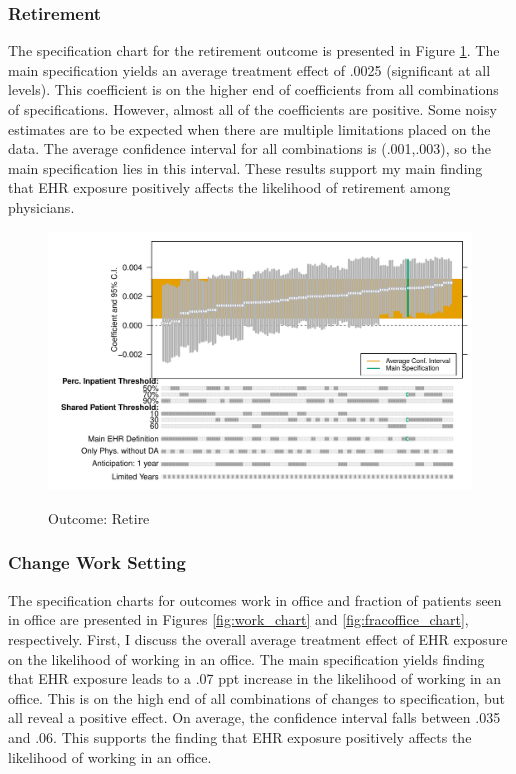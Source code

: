 \documentclass[12pt]{article}
\begin{document}
\subsubsection{Retirement}

The specification chart for the retirement outcome is presented in Figure \ref{fig:retire_chart}. The main specification yields an average treatment effect of .0025 (significant at all levels). This coefficient is on the higher end of coefficients from all combinations of specifications. However, almost all of the coefficients are positive. Some noisy estimates are to be expected when there are multiple limitations placed on the data. The average confidence interval for all combinations is (.001,.003), so the main specification lies in this interval. These results support my main finding that EHR exposure positively affects the likelihood of retirement among physicians. 

\begin{figure}[ht]
    \centering
    \caption{Outcome: Retire}
    \includegraphics[scale=.6]{Objects/retire_chart.pdf}
    \label{fig:retire_chart}
\end{figure}

\subsubsection{Change Work Setting}

The specification charts for outcomes work in office and fraction of patients seen in office are presented in Figures \ref{fig:work_chart} and \ref{fig:fracoffice_chart}, respectively. First, I discuss the overall average treatment effect of EHR exposure on the likelihood of working in an office. The main specification yields finding that EHR exposure leads to a .07 ppt increase in the likelihood of working in an office. This is on the high end of all combinations of changes to specification, but all reveal a positive effect. On average, the confidence interval falls between .035 and .06. This supports the finding that EHR exposure positively affects the likelihood of working in an office.  
\end{document}
